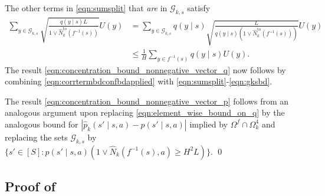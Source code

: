 \documentclass[11pt]{article}
\newcommand{\mcG}{\mathcal{G}}
\theoremstyle{definition}
\theoremstyle{definition}
\begin{document}
The other terms in \eqref{eqn:sumsplit} that \textit{are} in $\mcG_{k,s}$ satisfy
\begin{equation}
	\label{eqn:gksbd}
	\begin{split}
		\sum_{y\in  \mcG_{k,s}}
		\sqrt{\frac{q(y\mid s) L}{1\vee\hat{N}^{\mathrm{to}}_k(f^{-1}(s))}}U(y)
		 &
		=
		\sum_{y\in  \mcG_{k,s}}
		q(y\mid s)\sqrt{\frac{ L}{q(y\mid s)(1\vee\hat{N}^{\mathrm{to}}_k(f^{-1}(s)))}}U(y)
		\\
		 &
		\leq
		\frac{1}{H}
		\sum_{y\in f^{-1}(s)}
		q(y\mid s)U(y).
	\end{split}
\end{equation}
The result \eqref{eqn:concentration_bound_nonnegative_vector_q} now follows by combining \eqref{eqn:corrtermbdconfbdapplied} with \eqref{eqn:sumsplit}-\eqref{eqn:gksbd}.

The result \eqref{eqn:concentration_bound_nonnegative_vector_p} follows from an analogous argument upon replacing \eqref{eqn:element_wise_bound_on_q} by the analogous bound for $|\hat{p}_k(s'\mid s,a)-p(s'\mid s,a)|$ implied by $\Omega^f\cap\Omega_k^4$ and replacing the sets $\mcG_{k,s}$ by $\{s'\in[S]:p(s'\mid s,a)(1\vee \hat{N}_k(f^{-1}(s),a)\geq H^2L)\}$.
\qed

\subsection{Proof of \texorpdfstring{}{the recursive bound}}
\label{sec:proof_of_estimation_error_bound}
\end{document}
